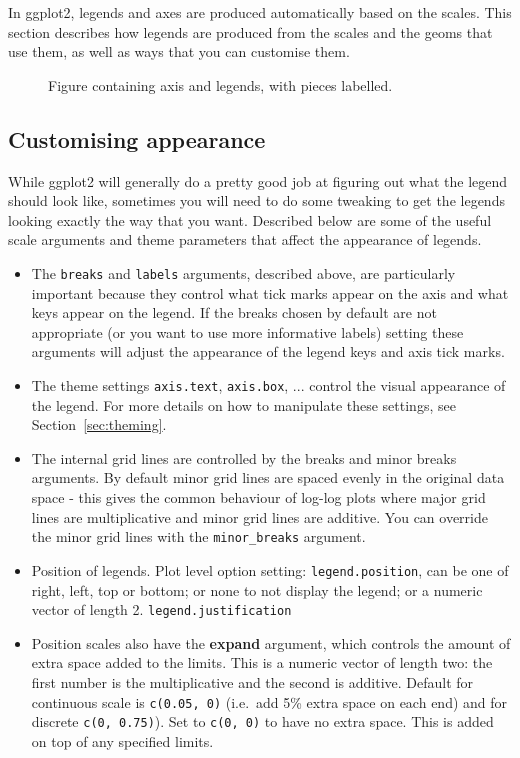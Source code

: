 In ggplot2, legends and axes are produced automatically based on the scales.  This section describes how legends are produced from the scales and the geoms that use them, as well as ways that you can customise them.

\begin{figure}[htbp]
  \centering
  \caption{Figure containing axis and legends, with pieces labelled.}
  \label{fig:label}
\end{figure}

\subsection{Customising appearance}

While ggplot2 will generally do a pretty good job at figuring out what the legend should look like, sometimes you will need to do some tweaking to get the legends looking exactly the way that you want.  Described below are some of the useful scale arguments and theme parameters that affect the appearance of legends.  

\begin{itemize}
  \item The {\tt breaks} and {\tt labels} arguments, described above, are particularly important because they control what tick marks appear on the axis and what keys appear on the legend.  If the breaks chosen by default are not appropriate (or you want to use more informative labels) setting these arguments will adjust the appearance of the legend keys and axis tick marks.  
  
  \item The theme settings {\tt axis.text}, {\tt axis.box}, ... control the visual appearance of the legend.  For more details on how to manipulate these settings, see Section~\ref{sec:theming}.

  \item The internal grid lines are controlled by the breaks and minor breaks arguments.  By default minor grid lines are spaced evenly in the original data space - this gives the common behaviour of log-log plots where major grid lines are multiplicative and minor grid lines are additive.  You can override the minor grid lines with the {\tt minor\_breaks} argument.
  
  \item Position of legends.  Plot level option setting: {\tt legend.position}, can be one of right, left, top or bottom; or none to not display the legend; or a numeric vector of length 2.  {\tt legend.justification}
  
  \item Position scales also have the {\bf expand} argument, which controls the amount of extra space added to the limits.  This is a numeric vector of length two: the first number is the multiplicative and the second is additive.  Default for continuous scale is {\tt c(0.05, 0)} (i.e.\ add 5\% extra space on each end) and for discrete {\tt c(0, 0.75)}).  Set to {\tt c(0, 0)} to have no extra space.  This is added on top of any specified limits.
  
\end{itemize}

